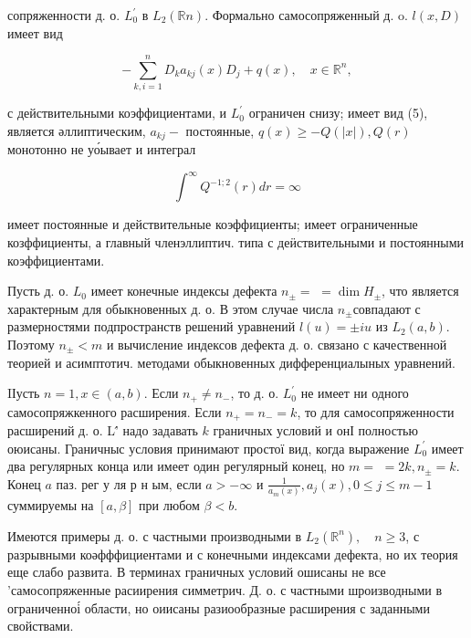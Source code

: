 \documentclass[10pt]{article}
\begin{document}
сопряженности д. о. $L_{0}^{\prime}$ в $L_{2}(\mathbb{R} n)$. Формально самосопряженный д. o. $l(x, D)$ имеет вид



\[

-\sum_{k, i=1}^{n} D_{k} a_{k j}(x) D_{j}+q(x), \quad x \in \mathbb{R}^{n},

\]



с действительными коэффициентами, и $L_{0}^{\prime}$ ограничен снизу; имеет вид (5), является әллиптическим, $a_{k j}-$ постоянные, $q(x) \geqslant-Q(|x|), Q(r)$ монотонно не уо́ывает и интеграл



\[

\int^{\infty} Q^{-1 ; 2}(r) d r=\infty

\]



имеет постоянные и действительные коэффициенты; имеет ограниченные козффициенты, а главный членэллиптич. типа с деӥствительными и постоянными коэффициентами.



Пусть д. о. $L_{0}$ имеет конечные индексы дефекта $n_{ \pm}=$ $=\operatorname{dim} H_{ \pm}$, что является характерным для обыкновенных д. о. В этом случае числа $n_{ \pm}$совпадают с размерностями подпространств решений уравнений $l(u)= \pm i u$ из $L_{2}(a, b)$. Поэтому $n_{ \pm}<m$ и вычисление индексов дефекта д. о. связано с качественной теорией и асимптотич. методами обыкновенных дифференциалыных уравнений.



IІусть $n=1, x \in(a, b)$. Если $n_{+} \neq n_{-}$, то д. о. $L_{0}^{\prime}$ не имеет ни одного самосопряжкенного расширения. Если $n_{+}=n_{-}=k$, то для самосопряженности расширений д. о. L'́ надо задавать $k$ граничных условий и онІ полностью оюисаны. Граничныс условия принимают простої вид, когда выражение $L_{0}^{\prime}$ имеет два регулярных конца или имеет один регулярный конец, но $m=$ $=2 k, n_{ \pm}=k$. Конец $a$ паз. рег у ля р н ым, если $a>-\infty$ и $\frac{1}{a_{m}(x)}, a_{j}(x), 0 \leqslant j \leqslant m-1$ суммируемы на $[a, \beta]$ при любом $\beta<b$.



Имеются примеры д. о. с частными производными в $L_{2}\left(\mathbb{R}^{n}\right), \quad n \geqslant 3$, с разрывными коәфффициентами и с конечными индексами дефекта, но их теория еще слабо развита. В терминах граничных условий ошисаны не все 'самосопряженные расиирения симметрич. Д. о. с частными шроизводными в ограниченноі́ области, но оиисаны разиообразные расширения с заданными свойствами.
\end{document}
